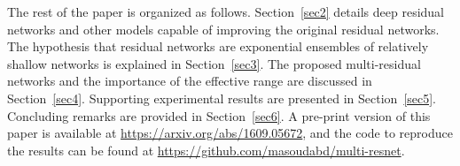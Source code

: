 \documentclass[journal]{IEEEtran}
\begin{document}
The rest of the paper is organized as follows. Section~\ref{sec2} details deep residual networks and other models capable of improving the original residual networks. The hypothesis that residual networks are exponential ensembles of relatively shallow networks is explained in Section~\ref{sec3}. The proposed multi-residual networks and the importance of the effective range are discussed in Section~\ref{sec4}.  Supporting experimental results are presented in Section~\ref{sec5}. Concluding remarks are provided in Section~\ref{sec6}. A pre-print version of this paper \cite{mine} is available at \url{https://arxiv.org/abs/1609.05672}, and the code to reproduce the results can be found at \url{https://github.com/masoudabd/multi-resnet}.



%
%

\end{document}
